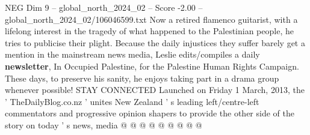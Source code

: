 \begin{textsample}{NEG Dim 9 – global\_north\_2024\_02 – Score -2.00 – global\_north\_2024\_02/106046599.txt}
Now a retired flamenco guitarist, with a lifelong interest in the tragedy of what happened to the Palestinian people, he tries to publicise their plight.
Because the daily injustices they suffer barely get a mention in the mainstream news media, Leslie edits/compiles a daily \textbf{newsletter}, In Occupied Palestine, for the Palestine Human Rights Campaign.
These days, to preserve his sanity, he enjoys taking part in a drama group whenever possible!
STAY CONNECTED Launched on Friday 1 March, 2013, the ' TheDailyBlog.co.nz ' unites New Zealand ' s leading left/centre-left commentators and progressive opinion shapers to provide the other side of the story on today ' s news, media @ @ @ @ @ @ @ @ @

\end{textsample}
